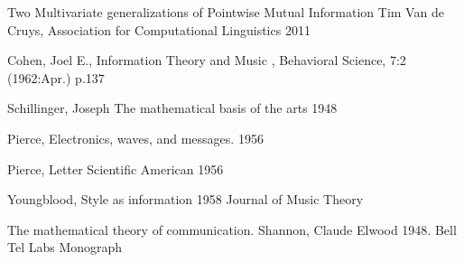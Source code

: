 \documentclass[final,authoryear,11pt,times]{elsarticle}
\begin{document}
Two Multivariate generalizations of Pointwise Mutual Information Tim Van de Cruys, Association for Computational Linguistics 2011

Cohen, Joel E., Information Theory and Music , Behavioral Science, 7:2 (1962:Apr.) p.137

Schillinger, Joseph The mathematical basis of the arts 1948

Pierce, Electronics, waves, and messages. 1956

Pierce, Letter Scientific American 1956

Youngblood, Style as information 1958 Journal of Music Theory

The mathematical theory of communication. Shannon, Claude Elwood 1948. Bell Tel Labs Monograph









\end{document}
